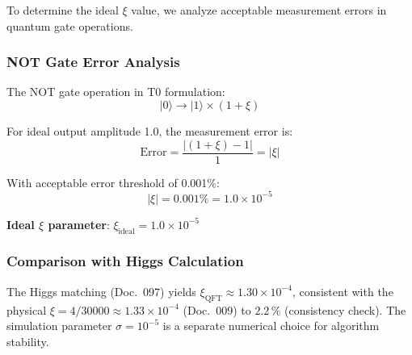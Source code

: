 	To determine the ideal $\xi$ value, we analyze acceptable measurement errors in quantum gate operations.
	
	\subsubsection{NOT Gate Error Analysis}
	
	The NOT gate operation in T0 formulation:
	\begin{equation}
		|0\rangle \rightarrow |1\rangle \times (1 + \xi)
	\end{equation}
	
	For ideal output amplitude 1.0, the measurement error is:
	\begin{equation}
		\text{Error} = \frac{|(1 + \xi) - 1|}{1} = |\xi|
	\end{equation}
	
	With acceptable error threshold of 0.001\%:
	\begin{equation}
		|\xi| = 0.001\% = 1.0 \times 10^{-5}
	\end{equation}
	
	\textbf{Ideal $\xi$ parameter}: $\xi_{\text{ideal}} = 1.0 \times 10^{-5}$
	
	\subsubsection{Comparison with Higgs Calculation}
	
	\begin{table}[htbp]
		\centering
		\caption{$\xi$ Parameter Source Comparison}
	\end{table}
	
	The Higgs matching (Doc.~097) yields $\xi_{\text{QFT}} \approx 1.30 \times 10^{-4}$, consistent with the physical $\xi = 4/30000 \approx 1.33 \times 10^{-4}$ (Doc.~009) to $2.2\,\%$ (consistency check). The simulation parameter $\sigma = 10^{-5}$ is a separate numerical choice for algorithm stability.
	
